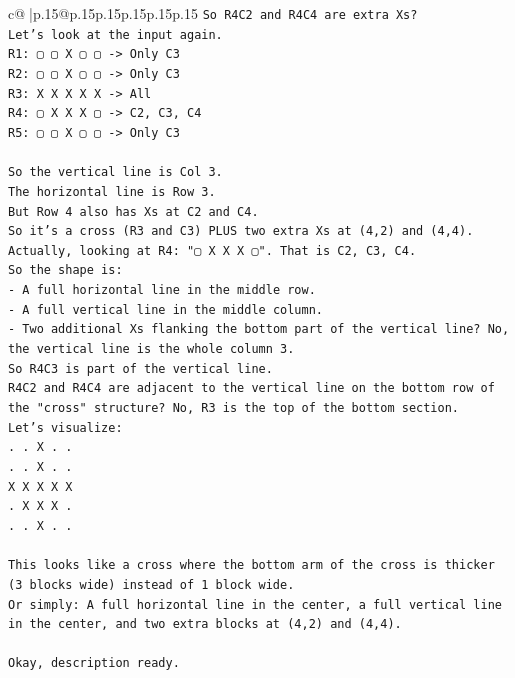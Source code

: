 \documentclass{article}
\begin{document}
{\begin{supertabular}{c@{$\;$}|p{.15\linewidth}@{}p{.15\linewidth}p{.15\linewidth}p{.15\linewidth}p{.15\linewidth}p{.15\linewidth}}
{{{\texttt{So R4C2 and R4C4 are extra Xs?} \\
\texttt{Let's look at the input again.} \\
\texttt{R1: ▢ ▢ X ▢ ▢ {-}> Only C3} \\
\texttt{R2: ▢ ▢ X ▢ ▢ {-}> Only C3} \\
\texttt{R3: X X X X X {-}> All} \\
\texttt{R4: ▢ X X X ▢ {-}> C2, C3, C4} \\
\texttt{R5: ▢ ▢ X ▢ ▢ {-}> Only C3} \\
\\ 
\texttt{So the vertical line is Col 3.} \\
\texttt{The horizontal line is Row 3.} \\
\texttt{But Row 4 also has Xs at C2 and C4.} \\
\texttt{So it's a cross (R3 and C3) PLUS two extra Xs at (4,2) and (4,4).} \\
\texttt{Actually, looking at R4: "▢ X X X ▢". That is C2, C3, C4.} \\
\texttt{So the shape is:} \\
\texttt{{-} A full horizontal line in the middle row.} \\
\texttt{{-} A full vertical line in the middle column.} \\
\texttt{{-} Two additional Xs flanking the bottom part of the vertical line? No, the vertical line is the whole column 3.} \\
\texttt{So R4C3 is part of the vertical line.} \\
\texttt{R4C2 and R4C4 are adjacent to the vertical line on the bottom row of the "cross" structure? No, R3 is the top of the bottom section.} \\
\texttt{Let's visualize:} \\
\texttt{. . X . .} \\
\texttt{. . X . .} \\
\texttt{X X X X X} \\
\texttt{. X X X .} \\
\texttt{. . X . .} \\
\\ 
\texttt{This looks like a cross where the bottom arm of the cross is thicker (3 blocks wide) instead of 1 block wide.} \\
\texttt{Or simply: A full horizontal line in the center, a full vertical line in the center, and two extra blocks at (4,2) and (4,4).} \\
\\ 
\texttt{Okay, description ready.} \\
}}}
\end{supertabular}}
\end{document}
